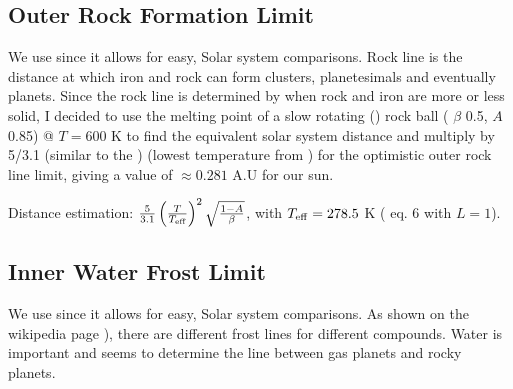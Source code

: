 \documentclass[letterpaper,10pt,english]{sphinxmanual}
\begin{document}
\subsection{Outer Rock Formation Limit}
\label{\detokenize{quantities/children_orbit_limits/outer_rock_formation_limit:outer-rock-formation-limit}}\label{\detokenize{quantities/children_orbit_limits/outer_rock_formation_limit::doc}}\label{\detokenize{quantities/children_orbit_limits/outer_rock_formation_limit:id1}}
\sphinxAtStartPar
We use {\hyperref[\detokenize{quantities/insolation_models/selsis/selsis:selsis-insolation-model}]{}} since it allows for easy, Solar system comparisons.
Rock line is the distance at which iron and rock can form clusters, planetesimals and eventually planets.
Since the rock line is determined by when rock and iron are more or less solid, I decided to use
the melting point of a slow rotating ({\hyperref[\detokenize{quantities/children_orbit_limits/tidal_locking_radius:id1}]{}}) rock ball
({\hyperref[\detokenize{quantities/surface/emission/heat_distribution:id1}]{}} \(\beta\) 0.5, {\hyperref[\detokenize{quantities/surface/emission/albedo:id1}]{}} \(A\) 0.85)
@ \(T = 600\) K to find the equivalent solar system distance
and multiply by 5/3.1 (similar to the {\hyperref[\detokenize{quantities/children_orbit_limits/outer_water_frost_limit:id1}]{}})
(lowest temperature from )
for the optimistic outer rock line limit, giving a value of \(\approx 0.281\) A.U for our sun.

\sphinxAtStartPar
Distance estimation: \(\frac{5}{3.1}\left(\frac{T}{T_{\rm eff}}\right) ^ 2 \sqrt{\frac{1-A}{\beta}}\),
with \(T_{\rm eff} = 278.5\) K ( eq. 6 with \(L = 1\)).


\subsection{Inner Water Frost Limit}
\label{\detokenize{quantities/children_orbit_limits/inner_water_frost_limit:inner-water-frost-limit}}\label{\detokenize{quantities/children_orbit_limits/inner_water_frost_limit::doc}}\label{\detokenize{quantities/children_orbit_limits/inner_water_frost_limit:id1}}
\sphinxAtStartPar
We use {\hyperref[\detokenize{quantities/insolation_models/selsis/selsis:selsis-insolation-model}]{}} since it allows for easy, Solar system comparisons.
As shown on the wikipedia page ), there are different
frost lines for different compounds. Water is important and seems to determine the line between gas planets and
rocky planets.
\end{document}

